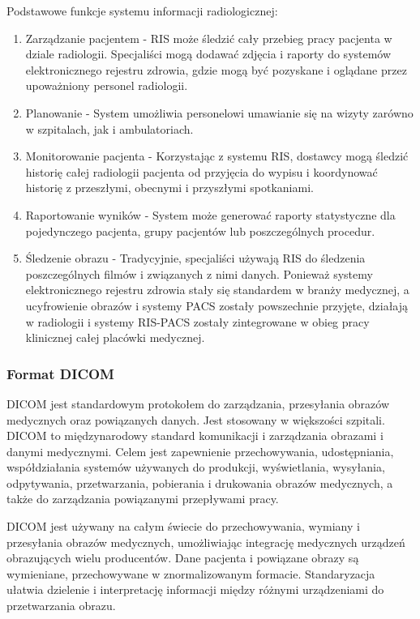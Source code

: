 \documentclass[a4paper,11pt,twoside]{report}
\theoremstyle{definition}
\begin{document}
Podstawowe funkcje systemu informacji radiologicznej:
\begin{enumerate}
\item Zarządzanie pacjentem - RIS może śledzić cały przebieg pracy pacjenta w dziale radiologii. Specjaliści mogą dodawać zdjęcia i raporty do systemów elektronicznego rejestru zdrowia, gdzie mogą być pozyskane i oglądane przez upoważniony personel radiologii.
\item Planowanie - System umożliwia personelowi umawianie się na wizyty zarówno w szpitalach, jak i ambulatoriach.
\item Monitorowanie pacjenta - Korzystając z systemu RIS, dostawcy mogą śledzić historię całej radiologii pacjenta od przyjęcia do wypisu i koordynować historię z przeszłymi, obecnymi i przyszłymi spotkaniami.
\item Raportowanie wyników - System może generować raporty statystyczne dla pojedynczego pacjenta, grupy pacjentów lub poszczególnych procedur.
\item Śledzenie obrazu - Tradycyjnie, specjaliści używają RIS do śledzenia poszczególnych filmów i związanych z nimi danych. Ponieważ systemy elektronicznego rejestru zdrowia stały się standardem w branży medycznej, a ucyfrowienie obrazów i systemy PACS zostały powszechnie przyjęte, działają w radiologii i  systemy RIS-PACS zostały zintegrowane w obieg pracy klinicznej całej placówki medycznej.
\end{enumerate}

\subsubsection{Format DICOM}

DICOM jest standardowym protokołem do zarządzania,  przesyłania obrazów medycznych oraz powiązanych danych.  Jest stosowany w większości szpitali. DICOM to międzynarodowy standard komunikacji i zarządzania obrazami i danymi medycznymi. Celem jest zapewnienie przechowywania, udostępniania, współdziałania systemów używanych do produkcji, wyświetlania, wysyłania, odpytywania, przetwarzania, pobierania i drukowania obrazów medycznych, a także do zarządzania powiązanymi przepływami pracy.
\par
DICOM jest używany na całym świecie do przechowywania, wymiany i przesyłania obrazów medycznych, umożliwiając integrację medycznych urządzeń obrazujących wielu producentów. Dane pacjenta i powiązane obrazy są wymieniane, przechowywane w znormalizowanym formacie.
Standaryzacja ułatwia dzielenie i interpretację informacji między różnymi urządzeniami do przetwarzania obrazu.
\end{document}
